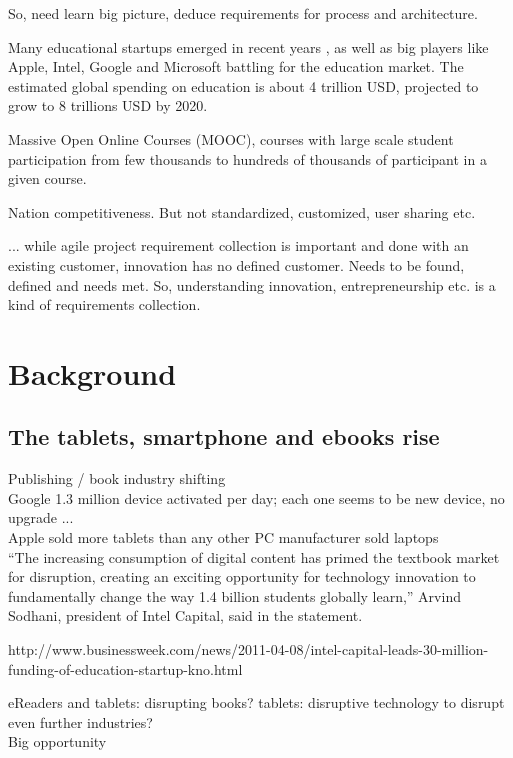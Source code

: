 \documentclass[a4paper,10pt]{book}
\begin{document}
So, need learn big picture, deduce requirements for process and architecture.

Many educational startups emerged in recent years \cite{boomEducation1}\cite{boomEducation2}, as well as big players like Apple, Intel, 
Google and Microsoft battling for the education market. The estimated global spending on education is about 4 trillion USD, projected to grow to
8 trillions USD by 2020.

Massive Open Online Courses (MOOC), courses with large scale student participation from few thousands to hundreds of thousands of participant 
in a given course.


Nation competitiveness. But not standardized, customized, user sharing etc.

... while agile project requirement collection is important and done with an existing customer, innovation 
has no defined customer. Needs to be found, defined and needs met.
So, understanding innovation, entrepreneurship etc. is a kind of requirements collection.

\section{Background}
\subsection{The tablets, smartphone and ebooks rise}
Publishing / book industry shifting
\\
Google 1.3 million device activated per day; each one seems to be new device, no upgrade ...
\\ 
Apple sold more tablets than any other PC manufacturer sold laptops
\\
“The increasing consumption of digital content has primed the textbook market for disruption, 
creating an exciting opportunity for technology innovation to fundamentally change the way 
1.4 billion students globally learn,” Arvind Sodhani, president of Intel Capital, said in the statement.

http://www.businessweek.com/news/2011-04-08/intel-capital-leads-30-million-funding-of-education-startup-kno.html

eReaders and tablets: disrupting books?
tablets: disruptive technology to disrupt even further industries?
\\
Big opportunity

\newpage
\end{document}
